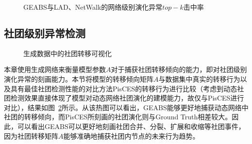   

\begin{figure}
	\centering
	\caption{GEABS与LAD、NetWalk的网络级别演化异常$top-k$击中率}
	\label{fig:enron-net}
\end{figure}






\subsection{社团级别异常检测}
\label{community anomaly}

\begin{figure}
	\centering
	\caption{生成数据中的社团转移可视化}
	\label{fig:mergesplitA}
\end{figure}

本章使用生成网络来衡量模型参数$A$对于捕获社团转移倾向的能力，即对社团级别演化异常的刻画能力。本节将模型的转移倾向矩阵$A$与数据集中真实的转移行为以及具有最佳社团检测性能的对比方法PisCES的转移行为进行比较（考虑到动态社团检测效果直接体现了模型对动态网络社团演化的建模能力，故仅与PisCES进行对比），结果如图~\ref{fig:mergesplitA}所示。从该热图可以看出，GEABS能够更好地捕获动态网络中社团的转移倾向，而PisCES所刻画的社团演化则与Ground Truth相差较大。因此，可以看出GEABS可以更好地刻画社团合并、分裂、扩展和收缩等社团事件，因为社团转移矩阵$A$能够准确地捕获社团内节点的未来行为趋势。




